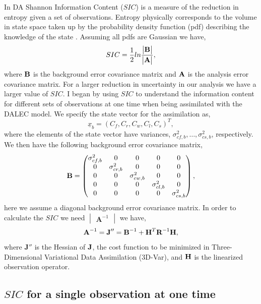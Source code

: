 \documentclass[11pt]{article}
\begin{document}
In DA Shannon Information Content ($SIC$) is a measure of the reduction in entropy given a set of observations. Entropy physically corresponds to the volume in state space taken up by the probability density function (pdf) describing the knowledge of the state \cite{rodgers2000inverse}. Assuming all pdfs are Gaussian we have,
\[
SIC=\frac{1}{2}ln\frac{\begin{vmatrix} \bf{B} \end{vmatrix}}{\begin{vmatrix} \bf{A} \end{vmatrix}},
\]
where $\bf{B}$ is the background error covariance matrix and $\bf{A}$ is the analysis error covariance matrix. For a larger reduction in uncertainty in our analysis we have a larger value of $SIC$. I began by using $SIC$ to understand the information content for different sets of observations at one time when being assimilated with the DALEC model. We specify the state vector for the assimilation as,
\[ \underline{x}_b = (C_f, C_r, C_w, C_l, C_s)^T, \] 
where the elements of the state vector have variances, $\sigma_{cf,b}^{2},\ldots,\sigma_{cs,b}^{2}$, respectively. We then have the following background error covariance matrix,
\[
\bf{B} = \begin{pmatrix} 
\sigma_{cf,b}^{2} & 0 & 0 & 0 & 0 \\
0 & \sigma_{cr,b}^{2} & 0 & 0 & 0 \\
0 & 0 & \sigma_{cw,b}^{2} & 0 & 0 \\
0 & 0 & 0 & \sigma_{cl,b}^{2} & 0 \\
0 & 0 & 0 & 0 & \sigma_{cs,b}^{2} \\
\end{pmatrix},
\]  
here we assume a diagonal background error covariance matrix. In order to calculate the $SIC$ we need $\begin{vmatrix} \textbf{A}^{-1} \end{vmatrix}$ we have,
\[
\textbf{A}^{-1}=\textbf{J}'' = \textbf{B}^{-1}+\textbf{H}^{T}\textbf{R}^{-1}\bf{H}, 
\]
where $\textbf{J}''$ is the Hessian of $\bf{J}$, the cost function to be minimized in Three-Dimensional Variational Data Assimilation (3D-Var), and $\bf{H}$ is the linearized observation operator. 

\subsection{$SIC$ for a single observation at one time}
\end{document}
